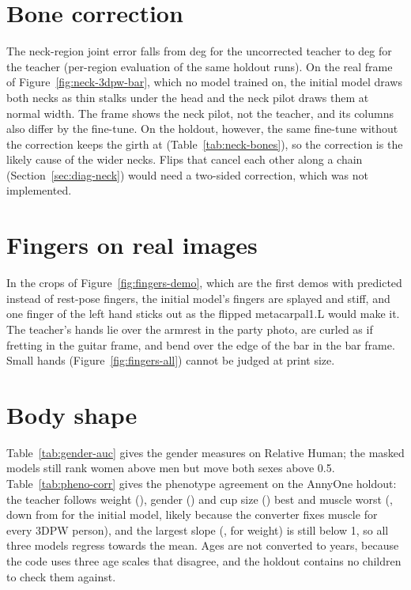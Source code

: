\section{Bone correction}

The neck-region joint error falls from \ControlNeckRegion{} deg for the uncorrected teacher to
\FinalNeckRegion{} deg for the teacher (per-region evaluation of the same holdout runs). On the real frame of
Figure~\ref{fig:neck-3dpw-bar}, which no model trained on, the initial model draws both necks as thin stalks under
the head and the neck pilot draws them at normal width. The frame shows the neck
pilot, not the teacher, and its columns also differ
by the fine-tune. On the holdout, however, the same fine-tune without the correction keeps the girth at
\BaseGirth{} (Table~\ref{tab:neck-bones}), so the correction is the likely cause of the wider necks. Flips that
cancel each other along a chain (Section~\ref{sec:diag-neck}) would need a two-sided correction, which was not
implemented.

\section{Fingers on real images}

In the crops of Figure~\ref{fig:fingers-demo}, which are the first demos with predicted instead of rest-pose
fingers, the initial model's fingers are splayed and stiff, and one finger of the left hand sticks out as the
flipped metacarpal1.L would make it. The teacher's hands lie over the armrest in the party photo, are curled as if
fretting in the guitar frame, and bend over the edge of the bar in the bar frame. Small hands
(Figure~\ref{fig:fingers-all}) cannot be judged at print size.

\section{Body shape}




Table~\ref{tab:gender-auc} gives the gender measures on Relative Human; the masked models still rank women above men
but move both sexes above 0.5. Table~\ref{tab:pheno-corr} gives the phenotype agreement on the AnnyOne holdout: the
teacher follows weight (\PhenoRFinalWeight), gender (\PhenoRFinalGender) and cup size (\PhenoRFinalCupsize) best and
muscle worst (\PhenoRFinalMuscle, down from \PhenoRBaseMuscle{} for the initial model, likely because the converter
fixes muscle for every 3DPW person), and the largest slope (\PhenoSlopeMaxFinal, for weight) is still below 1, so all
three models regress towards the mean. Ages are not converted to years, because the code uses three age scales that
disagree, and the holdout contains no children to check them against.

